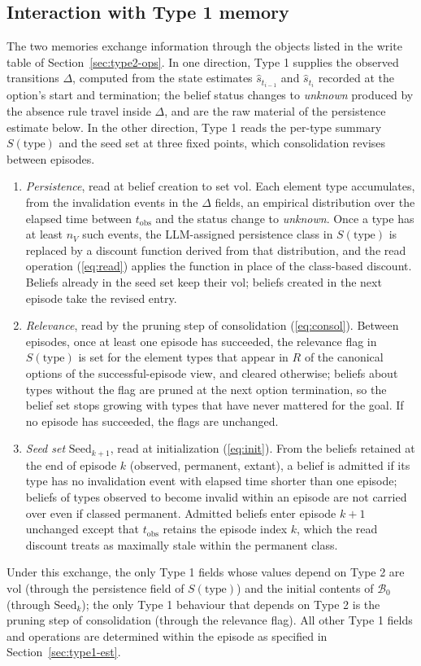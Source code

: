 \documentclass[11pt]{article}
\newcommand{\calB}{\mathcal{B}}
\newcommand{\Rel}{R}
\newcommand{\shat}{\hat{s}}
\newcommand{\vol}{\mathrm{vol}}
\newcommand{\type}{\mathrm{type}}
\newcommand{\tobs}{t_{\mathrm{obs}}}
\begin{document}
\subsection{Interaction with Type 1 memory}
\label{sec:type1-type2}

The two memories exchange information through the objects listed in the write table of Section~\ref{sec:type2-ops}. In one direction, Type 1 supplies the observed transitions $\Delta$, computed from the state estimates $\shat_{t_{i-1}}$ and $\shat_{t_i}$ recorded at the option's start and termination; the belief status changes to \emph{unknown} produced by the absence rule travel inside $\Delta$, and are the raw material of the persistence estimate below. In the other direction, Type 1 reads the per-type summary $S(\type)$ and the seed set at three fixed points, which consolidation revises between episodes.

\begin{enumerate}[leftmargin=1.5em,itemsep=1pt]
\item \emph{Persistence}, read at belief creation to set $\vol$. Each element type accumulates, from the invalidation events in the $\Delta$ fields, an empirical distribution over the elapsed time between $\tobs$ and the status change to \emph{unknown}. Once a type has at least $n_V$ such events, the LLM-assigned persistence class in $S(\type)$ is replaced by a discount function derived from that distribution, and the read operation (\ref{eq:read}) applies the function in place of the class-based discount. Beliefs already in the seed set keep their $\vol$; beliefs created in the next episode take the revised entry.
\item \emph{Relevance}, read by the pruning step of consolidation (\ref{eq:consol}). Between episodes, once at least one episode has succeeded, the relevance flag in $S(\type)$ is set for the element types that appear in $\Rel$ of the canonical options of the successful-episode view, and cleared otherwise; beliefs about types without the flag are pruned at the next option termination, so the belief set stops growing with types that have never mattered for the goal. If no episode has succeeded, the flags are unchanged.
\item \emph{Seed set} $\mathrm{Seed}_{k+1}$, read at initialization (\ref{eq:init}). From the beliefs retained at the end of episode $k$ (observed, permanent, extant), a belief is admitted if its type has no invalidation event with elapsed time shorter than one episode; beliefs of types observed to become invalid within an episode are not carried over even if classed permanent. Admitted beliefs enter episode $k+1$ unchanged except that $\tobs$ retains the episode index $k$, which the read discount treats as maximally stale within the permanent class.
\end{enumerate}

Under this exchange, the only Type 1 fields whose values depend on Type 2 are $\vol$ (through the persistence field of $S(\type)$) and the initial contents of $\calB_0$ (through $\mathrm{Seed}_k$); the only Type 1 behaviour that depends on Type 2 is the pruning step of consolidation (through the relevance flag). All other Type 1 fields and operations are determined within the episode as specified in Section~\ref{sec:type1-est}.
\end{document}
